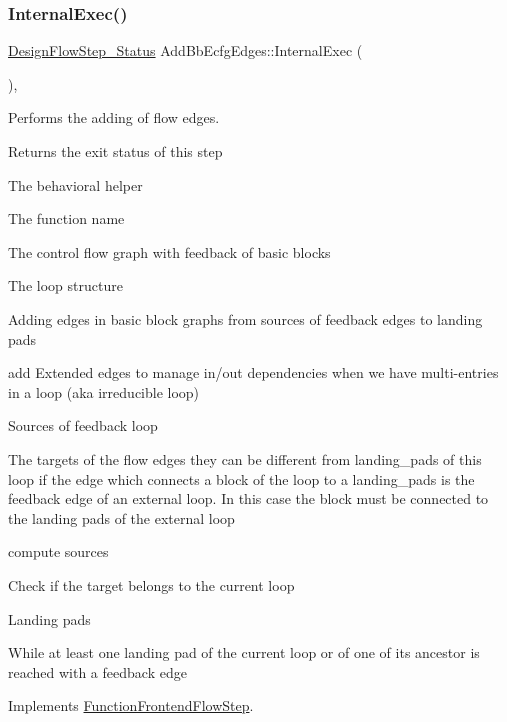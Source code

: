 \mbox{\label{classAddBbEcfgEdges_a68e4d52d843953b82aa4faf47c2585a1}} 
\subsubsection{\texorpdfstring{Internal\+Exec()}{InternalExec()}}
{\footnotesize\ttfamily \hyperlink{design__flow__step_8hpp_afb1f0d73069c26076b8d31dbc8ebecdf}{Design\+Flow\+Step\+\_\+\+Status} Add\+Bb\+Ecfg\+Edges\+::\+Internal\+Exec (\begin{DoxyParamCaption}{ }\end{DoxyParamCaption})\hspace{0.3cm}{\ttfamily [override]}, {\ttfamily [virtual]}}



Performs the adding of flow edges. 

\begin{DoxyReturn}{Returns}
the exit status of this step 
\end{DoxyReturn}
The behavioral helper

The function name

The control flow graph with feedback of basic blocks

The loop structure

Adding edges in basic block graphs from sources of feedback edges to landing pads

add Extended edges to manage in/out dependencies when we have multi-\/entries in a loop (aka irreducible loop)

Sources of feedback loop

The targets of the flow edges they can be different from landing\+\_\+pads of this loop if the edge which connects a block of the loop to a landing\+\_\+pads is the feedback edge of an external loop. In this case the block must be connected to the landing pads of the external loop

compute sources

Check if the target belongs to the current loop

Landing pads

While at least one landing pad of the current loop or of one of its ancestor is reached with a feedback edge 

Implements \hyperlink{classFunctionFrontendFlowStep_a00612f7fb9eabbbc8ee7e39d34e5ac68}{Function\+Frontend\+Flow\+Step}.



